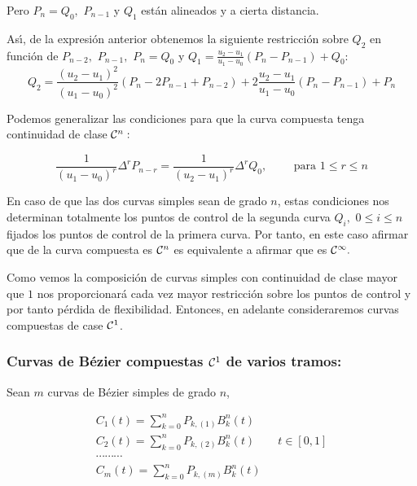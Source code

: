 \documentclass[twoside]{report}
\begin{document}
Pero $P_n=Q_0,$ $P_{n-1}$ y $Q_1$ est\'{a}n alineados y a cierta distancia.

\vspace{0.2cm}

As\'{\i}, de la expresi\'{o}n anterior obtenemos la siguiente restricci\'{o}n sobre $Q_2$ en funci\'{o}n de  $P_{n-2},$ $P_{n-1},$ $P_n=Q_0$ y $\displaystyle Q_1=\frac{u_2-u_1}{u_1-u_0}(P_n-P_{n-1})+Q_0$:
$$Q_2=\frac{(u_2-u_1)^2}{(u_1-u_0)^2}(P_n-2P_{n-1}+P_{n-2})+2\frac{u_2-u_1}{u_1-u_0}(P_n-P_{n-1})+P_n$$


Podemos generalizar las condiciones para que la curva compuesta tenga continuidad de clase ${\cal C}^n:$

$$\frac{1}{(u_1-u_0)^r}\Delta^rP_{n-r}=\frac{1}{(u_2-u_1)^r}\Delta^r Q_0, \quad \quad \mbox{ para } 1\leq r\leq n$$

En caso de que las dos curvas simples sean de grado $n$, estas condiciones nos determinan totalmente los puntos de control de la segunda curva $Q_i,$ \quad $0\leq i\leq n$ fijados los puntos de control de la primera curva. Por tanto, en este caso afirmar que de la curva compuesta es ${\cal C}^n$ es equivalente a afirmar que es ${\cal C}^{\infty}.$

\vspace{0.2cm}

Como vemos la composici\'{o}n de curvas simples con continuidad de clase mayor que $1$ nos proporcionar\'{a} cada vez mayor restricci\'{o}n sobre los puntos de control y por tanto p\'{e}rdida de flexibilidad. Entonces, en adelante consideraremos curvas compuestas de case ${\cal C}^1$.

\subsubsection{Curvas de Bézier compuestas ${\cal C}^1$ de varios tramos:}

Sean $m$ curvas de B\'{e}zier simples de grado $n$,

$$\begin{array}{l}
C_1(t)=\sum_{k=0}^n P_{k, (1)} B_k^n(t)\\
C_2(t)=\sum_{k=0}^n P_{k, (2)} B_k^n(t) \quad \quad t\in [0,1]\\
\cdots \cdots \cdots\\
C_m(t)=\sum_{k=0}^n P_{k, (m)} B_k^n(t)\\
\end{array}$$
\end{document}
